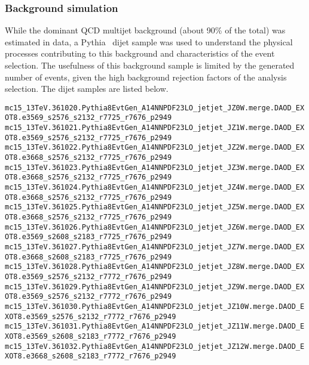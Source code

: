 \clearpage
\subsubsection{Background simulation}
While the dominant QCD multijet background (about 90\% of the total) was estimated in data, a Pythia~\cite{pythia8} dijet sample was used to understand the physical processes contributing to this background and characteristics of the event selection. The usefulness of this background sample is limited by the generated number of events, given the high background rejection factors of the analysis selection. The dijet samples are listed below.

\noindent
{\scriptsize
\verb|mc15_13TeV.361020.Pythia8EvtGen_A14NNPDF23LO_jetjet_JZ0W.merge.DAOD_EXOT8.e3569_s2576_s2132_r7725_r7676_p2949|\\
\verb|mc15_13TeV.361021.Pythia8EvtGen_A14NNPDF23LO_jetjet_JZ1W.merge.DAOD_EXOT8.e3569_s2576_s2132_r7725_r7676_p2949|\\
\verb|mc15_13TeV.361022.Pythia8EvtGen_A14NNPDF23LO_jetjet_JZ2W.merge.DAOD_EXOT8.e3668_s2576_s2132_r7725_r7676_p2949|\\
\verb|mc15_13TeV.361023.Pythia8EvtGen_A14NNPDF23LO_jetjet_JZ3W.merge.DAOD_EXOT8.e3668_s2576_s2132_r7725_r7676_p2949|\\
\verb|mc15_13TeV.361024.Pythia8EvtGen_A14NNPDF23LO_jetjet_JZ4W.merge.DAOD_EXOT8.e3668_s2576_s2132_r7725_r7676_p2949|\\
\verb|mc15_13TeV.361025.Pythia8EvtGen_A14NNPDF23LO_jetjet_JZ5W.merge.DAOD_EXOT8.e3668_s2576_s2132_r7725_r7676_p2949|\\
\verb|mc15_13TeV.361026.Pythia8EvtGen_A14NNPDF23LO_jetjet_JZ6W.merge.DAOD_EXOT8.e3569_s2608_s2183_r7725_r7676_p2949|\\
\verb|mc15_13TeV.361027.Pythia8EvtGen_A14NNPDF23LO_jetjet_JZ7W.merge.DAOD_EXOT8.e3668_s2608_s2183_r7725_r7676_p2949|\\
\verb|mc15_13TeV.361028.Pythia8EvtGen_A14NNPDF23LO_jetjet_JZ8W.merge.DAOD_EXOT8.e3569_s2576_s2132_r7772_r7676_p2949|\\
\verb|mc15_13TeV.361029.Pythia8EvtGen_A14NNPDF23LO_jetjet_JZ9W.merge.DAOD_EXOT8.e3569_s2576_s2132_r7772_r7676_p2949|\\
\verb|mc15_13TeV.361030.Pythia8EvtGen_A14NNPDF23LO_jetjet_JZ10W.merge.DAOD_EXOT8.e3569_s2576_s2132_r7772_r7676_p2949|\\
\verb|mc15_13TeV.361031.Pythia8EvtGen_A14NNPDF23LO_jetjet_JZ11W.merge.DAOD_EXOT8.e3569_s2608_s2183_r7772_r7676_p2949|\\
\verb|mc15_13TeV.361032.Pythia8EvtGen_A14NNPDF23LO_jetjet_JZ12W.merge.DAOD_EXOT8.e3668_s2608_s2183_r7772_r7676_p2949|
}


